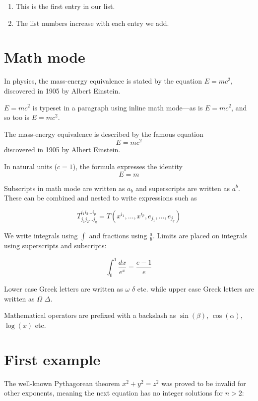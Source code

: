 \documentclass{article}
\begin{document}
\begin{enumerate}
  \item This is the first entry in our list.
  \item The list numbers increase with each entry we add.
\end{enumerate}


\section{Math mode}

In physics, the mass-energy equivalence is stated 
by the equation $E=mc^2$, discovered in 1905 by Albert Einstein.


\begin{math}
  E=mc^2
\end{math} is typeset in a paragraph using inline math mode---as is $E=mc^2$, and so too is \(E=mc^2\).


The mass-energy equivalence is described by the famous equation
\[ E=mc^2 \] discovered in 1905 by Albert Einstein. 

In natural units ($c = 1$), the formula expresses the identity
\begin{equation}
E=m
\end{equation}


Subscripts in math mode are written as $a_b$ and superscripts are written as $a^b$. These can be combined and nested to write expressions such as

\[ T^{i_1 i_2 \dots i_p}_{j_1 j_2 \dots j_q} = T(x^{i_1},\dots,x^{i_p},e_{j_1},\dots,e_{j_q}) \]
 
We write integrals using $\int$ and fractions using $\frac{a}{b}$. Limits are placed on integrals using superscripts and subscripts:

\[ \int_0^1 \frac{dx}{e^x} =  \frac{e-1}{e} \]

Lower case Greek letters are written as $\omega$ $\delta$ etc. while upper case Greek letters are written as $\Omega$ $\Delta$.

Mathematical operators are prefixed with a backslash as $\sin(\beta)$, $\cos(\alpha)$, $\log(x)$ etc.


\section{First example}

The well-known Pythagorean theorem \(x^2 + y^2 = z^2\) was proved to be invalid for other exponents, meaning the next equation has no integer solutions for \(n>2\):
\end{document}
